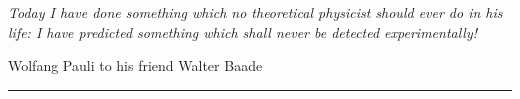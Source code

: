 \begin{flushright}
\begin{minipage}{.6\textwidth}
\begin{flushright}

\vskip5pt


\vskip7pt

{\it Today I have done something which no theoretical physicist should ever do in his life: I have predicted something which shall never be detected experimentally!}

\vskip5pt

\small{Wolfang Pauli to his friend Walter Baade}

\hrule

\vskip5pt


\end{flushright}
\end{minipage}
\end{flushright}

